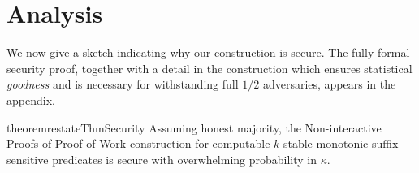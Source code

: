 \section{Analysis}
\label{sec:security}

We now give a sketch indicating why our construction is secure. The fully formal
security proof, together with a detail in the construction which ensures
statistical \emph{goodness} and is necessary for withstanding full $1/2$
adversaries, appears in the appendix.

\begin{restatable}[Security]{theorem}{restateThmSecurity}
    \label{thm.security}
    Assuming honest majority, the Non-interactive Proofs of Proof-of-Work
    construction for computable $k$-stable monotonic suffix-sensitive predicates
    is secure with overwhelming probability in $\kappa$.
\end{restatable}
